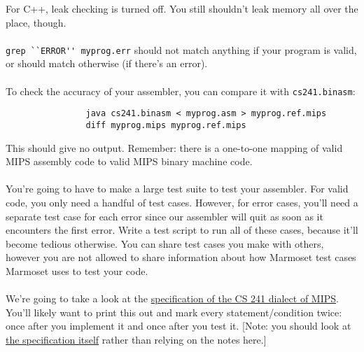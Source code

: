 \documentclass[]{article}
\theoremstyle{definition}
\begin{document}
			For C++, leak checking is turned off. You still shouldn't leak memory all over the place, though.
			\\ \\
			\verb+grep ``ERROR'' myprog.err+ should not match anything if your program is valid, or should match otherwise (if there's an error).
			\\ \\
			To check the accuracy of your assembler, you can compare it with \verb+cs241.binasm+:
			\begin{verbatim}
				java cs241.binasm < myprog.asm > myprog.ref.mips
				diff myprog.mips myprog.ref.mips
			\end{verbatim}
			This should give no output. Remember: there is a one-to-one mapping of valid MIPS assembly code to valid MIPS binary machine code.
			\\ \\
			You're going to have to make a large test suite to test your assembler. For valid code, you only need a handful of test cases. However, for error cases, you'll need a separate test case for each error since our assembler will quit as soon as it encounters the first error. Write a test script to run all of these cases, because it'll become tedious otherwise. You can share test cases you make with others, however you are not allowed to share information about how Marmoset test cases Marmoset uses to test your code.
			\\ \\
			We're going to take a look at the \href{https://www.student.cs.uwaterloo.ca/~cs241/mips/mipsasm.html}{specification of the CS 241 dialect of MIPS}. You'll likely want to print this out and mark every statement/condition twice: once after you implement it and once after you test it. [Note: you should look at \href{https://www.student.cs.uwaterloo.ca/~cs241/mips/mipsasm.html}{the specification itself} rather than relying on the notes here.]
			
\end{document}
